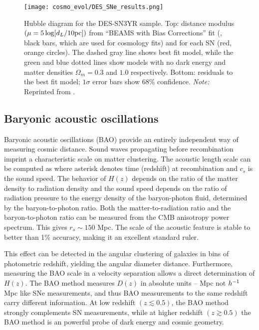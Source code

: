 \begin{figure}[hbt]
    \centering
    \texttt{[image: cosmo\_evol/DES\_SNe\_results.png]}
    \caption{Hubble diagram for the DES-SN3YR sample. Top: distance modulus $(\mu =5\log [d_L/10\rm{pc}])$ from ``BEAMS with Bias Corrections'' fit (\cite{Kessler_2017}, black bars, which are used for cosmology fits) and for each SN (red, orange circles). The dashed gray line shows best fit model, while the green and blue dotted lines show models with no dark energy and matter densities $\Omega_m = 0.3$ and $1.0$ respectively. Bottom: residuals to the best fit model; $1\sigma$ error bars show 68\% confidence. \textit{Note:} Reprinted from \textcite{Abbott_2019}.}
    \label{fig:des_sne_results}
\end{figure}
\subsection{Baryonic acoustic oscillations}
Baryonic acoustic oscillations (BAO) provide an entirely independent way of measuring cosmic distance. Sound waves propagating before recombination imprint a characteristic scale on matter clustering. The acoustic length scale can be computed as
where asterisk denotes time (redshift) at recombination and $c_s$ is the sound speed. The behavior of $H(z)$ depends on the ratio of the matter density to radiation density and the sound speed depends on the ratio of radiation pressure to the energy density of the baryon-photon fluid, determined by the baryon-to-photon ratio. Both the matter-to-radiation ratio and the baryon-to-photon ratio can be measured from the CMB anisotropy power spectrum. This gives $r_s\sim150$ Mpc. The scale of the acoustic feature is stable to better than 1\% accuracy, making it an excellent standard ruler.

This effect can be detected in the angular clustering of galaxies in bins of photometric redshift, yielding the angular diameter distance. Furthermore, measuring the BAO scale in a velocity separation allows a direct determination of $H(z)$. The BAO method measures $D(z)$ in absolute units -- Mpc not $h^{-1}$ Mpc like SNe measurements, and thus BAO measurements to the same redshift carry different information. At low redshift $(z\lesssim0.5)$, the BAO method strongly complements SN measurements, while at higher redshift $(z\gtrsim0.5)$ the BAO method is an powerful probe of dark energy and cosmic geometry.

